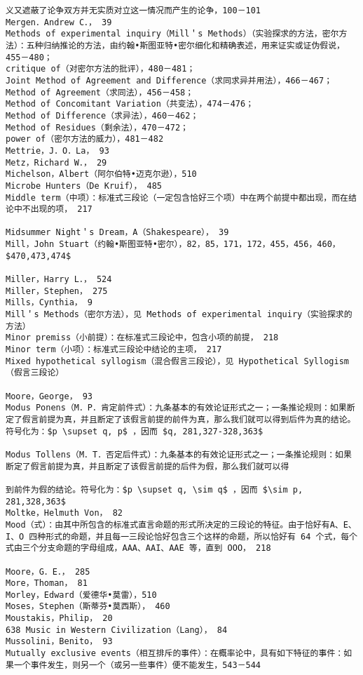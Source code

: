 \begin{verbatim}
义又遮蔽了论争双方并无实质对立这一情况而产生的论争，100－101
Mergen．Andrew C．， 39
Methods of experimental inquiry（Mill＇s Methods）（实验探求的方法，密尔方法）：五种归纳推论的方法，由约翰•斯图亚特•密尔细化和精确表述，用来证实或证伪假说，455－480；
critique of（对密尔方法的批评），480－481；
Joint Method of Agreement and Difference（求同求异并用法），466－467；
Method of Agreement（求同法），456－458；
Method of Concomitant Variation（共变法），474－476；
Method of Difference（求异法），460－462；
Method of Residues（剩余法），470－472；
power of（密尔方法的威力），481－482
Mettrie，J．O．La， 93
Metz，Richard W．， 29
Michelson，Albert（阿尔伯特•迈克尔逊），510
Microbe Hunters（De Kruif）， 485
Middle term（中项）：标准式三段论（一定包含恰好三个项）中在两个前提中都出现，而在结论中不出现的项， 217

Midsummer Night＇s Dream，A（Shakespeare）， 39
Mill，John Stuart（约翰•斯图亚特•密尔），82，85，171，172，455，456，460， $470,473,474$

Miller，Harry L．， 524
Miller，Stephen， 275
Mills，Cynthia， 9
Mill＇s Methods（密尔方法），见 Methods of experimental inquiry（实验探求的方法）
Minor premiss（小前提）：在标准式三段论中，包含小项的前提， 218
Minor term（小项）：标准式三段论中结论的主项， 217
Mixed hypothetical syllogism（混合假言三段论），见 Hypothetical Syllogism（假言三段论）

Moore，George， 93
Modus Ponens（M．P．肯定前件式）：九条基本的有效论证形式之一；一条推论规则：如果断定了假言前提为真，并且断定了该假言前提的前件为真，那么我们就可以得到后件为真的结论。符号化为：$p \supset q, p$ ，因而 $q, 281,327-328,363$

Modus Tollens（M．T．否定后件式）：九条基本的有效论证形式之一；一条推论规则：如果断定了假言前提为真，并且断定了该假言前提的后件为假，那么我们就可以得

到前件为假的结论。符号化为：$p \supset q, \sim q$ ，因而 $\sim p, 281,328,363$
Moltke，Helmuth Von， 82
Mood（式）：由其中所包含的标准式直言命题的形式所决定的三段论的特征。由于恰好有A、E、I、O 四种形式的命题，并且每一三段论恰好包含三个这样的命题，所以恰好有 64 个式，每个式由三个分支命题的字母组成，AAA、AAI、AAE 等，直到 OOO， 218

Moore，G．E．， 285
More，Thoman， 81
Morley，Edward（爱德华•莫雷），510
Moses，Stephen（斯蒂芬•莫西斯）， 460
Moustakis，Philip， 20
638 Music in Western Civilization（Lang）， 84
Mussolini，Benito， 93
Mutually exclusive events（相互排斥的事件）：在概率论中，具有如下特征的事件：如果一个事件发生，则另一个（或另一些事件）便不能发生，543－544


\end{verbatim}
